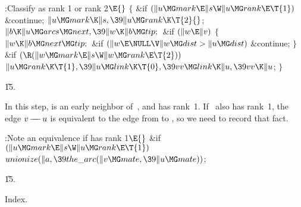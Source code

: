 \Y\B\4:Classify  as rank 1 or rank 2\X${}\E{}$\6
${}\{{}$\1\6
\&{if} ${}(\|u\MG\\{mark}\E\|s\W\|u\MG\\{rank}\E\T{1}){}$\1\5
\&{continue};\2\6
${}\|u\MG\\{mark}\K\|s,\39\|u\MG\\{rank}\K\T{2}{}$;\6
${}\|b\K\|u\MG\\{arcs}\MG\\{next},\39\|w\K\|b\MG\\{tip};{}$\6
\&{if} ${}(\|w\E\|v){}$\5
${}\{{}$\1\6
${}\|w\K\|b\MG\\{next}\MG\\{tip};{}$\6
\&{if} ${}(\|w\E\NULL\V\|w\MG\\{dist}>\|u\MG\\{dist}){}$\1\5
\&{continue};\2\6
\4${}\}{}$\2\6
\&{if} ${}(\R(\|w\MG\\{mark}\E\|s\W\|w\MG\\{rank}\E\T{2})){}$\1\5
${}\|u\MG\\{rank}\K\T{1},\39\|u\MG\\{link}\K\T{0},\39\\{vv}\MG\\{link}\K\|u,\39%
\\{vv}\K\|u{}$;\2\6
\4${}\}{}$\2\par
\U15.\fi

In this step,  is an early neighbor of~, and  has
rank~1. If ~also has rank~1, the edge $v\mathrel{\!\mathrel-\mkern-8mu\mathrel-\mkern-8mu\mathrel-\!} u$ is equivalent
to the edge from  to , so we need to
record
that fact.

\Y\B\4:Note an equivalence if  has rank 1\X${}\E{}$\6
\&{if} ${}(\|u\MG\\{mark}\E\|s\W\|u\MG\\{rank}\E\T{1}){}$\1\5
${}\\{unionize}(\|a,\39\\{the\_arc}(\|v\MG\\{mate},\39\|u\MG\\{mate})){}$;\2\par
\U15.\fi

Index.
\fi

\inx
\fin
\con
